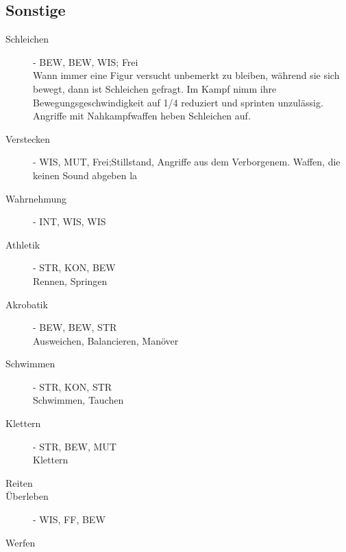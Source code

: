 \documentclass[a4paper,12pt,oneside]{book}
\begin{document}
\subsection{Sonstige}
\begin{description}
\item[Schleichen]- BEW, BEW, WIS; Frei
\\Wann immer eine Figur versucht unbemerkt zu bleiben, während sie sich bewegt, dann ist Schleichen gefragt. Im Kampf nimm ihre Bewegungsgeschwindigkeit auf 1/4 reduziert und sprinten unzulässig. Angriffe mit Nahkampfwaffen heben Schleichen auf.
\item[Verstecken]- WIS, MUT,  Frei;Stillstand, Angriffe aus dem Verborgenem. Waffen, die keinen Sound abgeben la
\item[Wahrnehmung]- INT, WIS, WIS
\item[Athletik]- STR, KON, BEW
\\Rennen, Springen 
\item[Akrobatik]- BEW, BEW, STR
\\Ausweichen, Balancieren, Manöver
\item[Schwimmen]- STR, KON, STR
\\Schwimmen, Tauchen
\item[Klettern]- STR, BEW, MUT
\\Klettern
\item[Reiten]
\item[Überleben]- WIS, FF, BEW
\item[Werfen]
\end{description}
\end{document}
